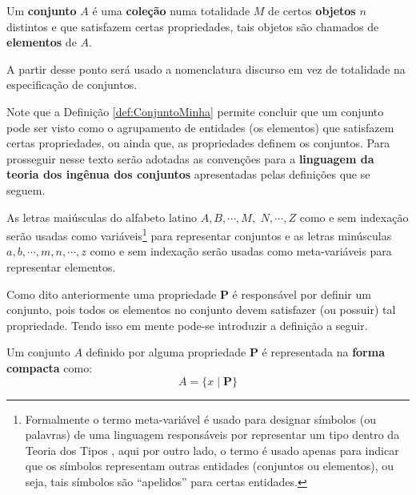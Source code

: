 \begin{definition}\label{def:ConjuntoMinha}
	Um \textbf{conjunto} $A$ é uma \textbf{coleção} numa totalidade $M$ de certos \textbf{objetos} $n$ distintos e que satisfazem certas propriedades, tais objetos são chamados de \textbf{elementos} de $A$.
\end{definition}

\begin{remark}
	A partir desse ponto será usado a nomenclatura discurso em vez de totalidade na especificação de conjuntos.
\end{remark}

Note que a Definição \ref{def:ConjuntoMinha} permite concluir que um conjunto pode ser visto como o agrupamento de entidades (os elementos) que satisfazem certas propriedades, ou ainda que, as propriedades definem os conjuntos. Para prosseguir nesse texto serão adotadas as convenções para a \textbf{linguagem da teoria dos ingênua dos conjuntos} apresentadas pelas definições que se seguem.

\begin{definition}\label{def:NotacaoConjuntos1}
	As letras maiúsculas do alfabeto latino $A, B, \cdots, M,$ $N, \cdots, Z$ como e sem indexação serão usadas como variáveis\footnote{Formalmente o termo meta-variável é usado para designar símbolos (ou palavras) de uma linguagem responsáveis por representar um tipo dentro da Teoria dos Tipos \cite{sato2003}, aqui por outro lado, o termo é usado apenas para indicar que os símbolos representam outras entidades (conjuntos ou elementos), ou seja, tais símbolos são ``apelidos'' para certas entidades.} para representar conjuntos e as letras minúsculas $a, b, \cdots, m, n, \cdots, z$ como e sem indexação serão usadas como meta-variáveis para representar elementos.
\end{definition}

Como dito anteriormente uma propriedade $\textbf{P}$ é responsável por definir um conjunto, pois todos os elementos no conjunto devem satisfazer (ou possuir) tal propriedade. Tendo isso em mente pode-se introduzir a definição a seguir.

\begin{definition}\label{def:NotacaoCompacta}
	Um conjunto $A$ definido por alguma propriedade $\textbf{P}$ é representada na \textbf{forma compacta} como:
	\begin{equation}
		A = \{ x \mid \textbf{P}\}
	\end{equation}
\end{definition}

